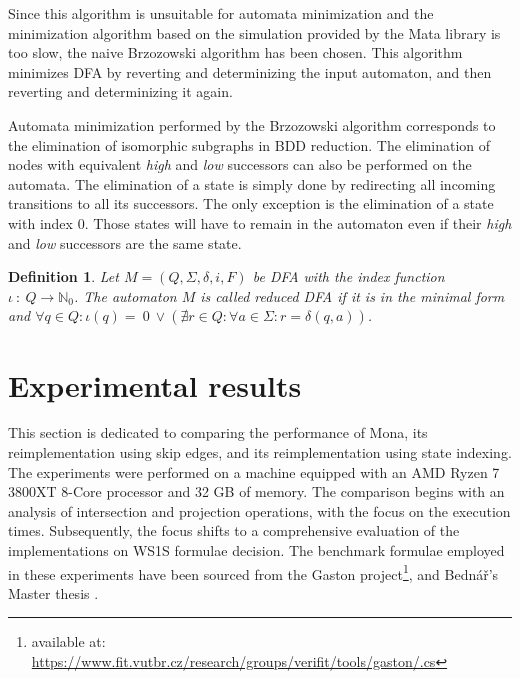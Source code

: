 \documentclass[pdflatex,sn-mathphys-num]{sn-jnl}%
\theoremstyle{thmstyleone}%
\theoremstyle{thmstyletwo}%
\theoremstyle{thmstylethree}%
\newtheorem{definition}{Definition}%
\begin{document}
        Since this algorithm is unsuitable for automata minimization and the minimization algorithm based on the simulation provided by the Mata library is too slow, the naive Brzozowski algorithm \cite{Brzozowski} has been chosen. This algorithm minimizes DFA by reverting and determinizing the input automaton, and then reverting and determinizing it again.

        Automata minimization performed by the Brzozowski algorithm corresponds to the elimination of isomorphic subgraphs in BDD reduction. The elimination of nodes with equivalent \textit{high} and \textit{low} successors can also be performed on the automata. The elimination of a state is simply done by redirecting all incoming transitions to all its successors. The only exception is the elimination of a state with index $0$. Those states will have to remain in the automaton even if their \textit{high} and \textit{low} successors are the same state.

        \vspace*{0.5em}

        \begin{definition}
            Let $M = (Q, \Sigma, \delta, i, F)$ be DFA with the index function $\iota ~:~Q \rightarrow \mathbb{N}_0$. The automaton $M$ is called reduced DFA if it is in the minimal form and $\forall q \in Q : \iota(q) =~0~\lor (\nexists r \in Q : \forall a \in \Sigma : r = \delta(q, a))$.
        \end{definition}

\section{Experimental results}
    This section is dedicated to comparing the performance of Mona, its reimplementation using skip edges, and its reimplementation using state indexing. The experiments were performed on a machine equipped with an AMD Ryzen 7 3800XT 8-Core processor and 32 GB of memory. The comparison begins with an analysis of intersection and projection operations, with the focus on the execution times. Subsequently, the focus shifts to a comprehensive evaluation of the implementations on WS1S formulae decision. The benchmark formulae employed in these experiments have been sourced from the Gaston project\footnote{available at: \url{https://www.fit.vutbr.cz/research/groups/verifit/tools/gaston/.cs}}, and Bednář's Master thesis \cite{Bednar}.
\end{document}
